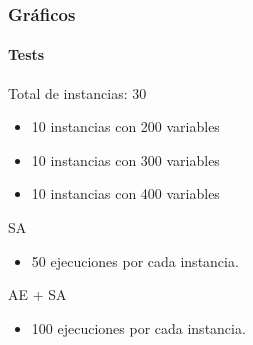 \frame
{
\frametitle{Gráficos}
\framesubtitle{Tests}
\begin{center}
	Total de instancias: 30
\end{center}
\begin{itemize}
	\item 10 instancias con 200 variables
	\item 10 instancias con 300 variables
	\item 10 instancias con 400 variables
\end{itemize}
\begin{block}{SA}
\begin{itemize}
	\item 50 ejecuciones por cada instancia.
\end{itemize}
\end{block}
\begin{block}{AE + SA}
\begin{itemize}
	\item 100 ejecuciones por cada instancia.
\end{itemize}
\end{block}
}


